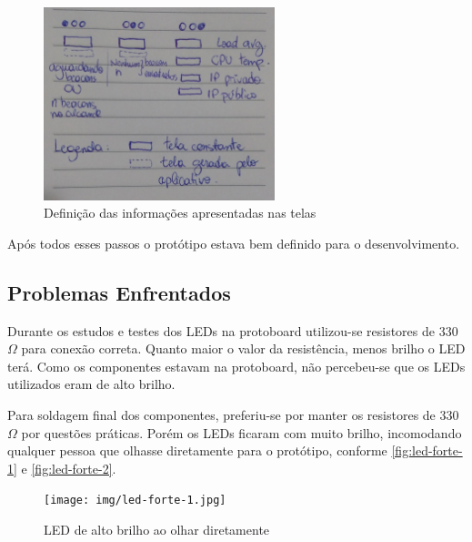 \documentclass[
		12pt,				%
		openright,			%
		oneside,			%
		a4paper,			%
		chapter=TITLE,		%
		english,			%
		brazil				%
	]{abntex2}
\begin{document}
\begin{figure}[htb]
	\caption{\label{fig:estrutura-telas}Definição das informações apresentadas nas telas}
	\begin{center}
		\includegraphics[width=0.6\textwidth]{img/estrutura-telas.jpg}
	\end{center}
\end{figure}

Após todos esses passos o protótipo estava bem definido para o desenvolvimento.\\


\subsection{Problemas Enfrentados}\label{sec:problemas-enfrentados}

Durante os estudos e testes dos LEDs na protoboard utilizou-se resistores de 330$\Omega$ para conexão correta. Quanto maior o valor da resistência, menos brilho o LED terá. Como os componentes estavam na protoboard, não percebeu-se que os LEDs utilizados eram de alto brilho.

Para soldagem final dos componentes, preferiu-se por manter os resistores de 330$\Omega$ por questões práticas. Porém os LEDs ficaram com muito brilho, incomodando qualquer pessoa que olhasse diretamente para o protótipo, conforme \autoref{fig:led-forte-1} e \autoref{fig:led-forte-2}.

\begin{figure}[htb]
	\caption{\label{fig:led-forte-1}LED de alto brilho ao olhar diretamente}
	\begin{center}
		\texttt{[image: img/led-forte-1.jpg]}
	\end{center}
\end{figure}
\end{document}
